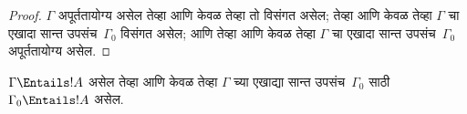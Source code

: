 \documentclass[../../../include/open-logic-section]{subfiles}
\begin{document}
\begin{proof}
$\Gamma$ अपूर्ततायोग्य असेल तेव्हा आणि केवळ तेव्हा तो विसंगत असेल;
तेव्हा आणि केवळ तेव्हा $\Gamma$ चा एखादा सान्त उपसंच~$\Gamma_0$
विसंगत असेल; आणि तेव्हा आणि केवळ तेव्हा $\Gamma$ चा एखादा सान्त
उपसंच~$\Gamma_0$ अपूर्ततायोग्य असेल.
\end{proof}

\begin{cor}
$\Gamma \Entails !A$ असेल तेव्हा आणि केवळ तेव्हा $\Gamma$ च्या
एखाद्या सान्त उपसंच~$\Gamma_0$ साठी $\Gamma_0 \Entails !A$ असेल.
\end{cor}
\end{document}
